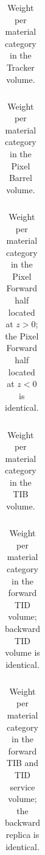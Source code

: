 \documentclass{cmspaper}
\begin{document}
\vskip 1cm


\begin{table}[h]
\begin{center}
\begin{tabular}{clrrrrrr}

\end{tabular}
\caption{Weight per material category in the Tracker volume.}
\end{center}
\end{table}

\begin{table}[h]
\begin{center}
\begin{tabular}{clrrrrrr}

\end{tabular}
\caption{Weight per material category in the Pixel Barrel volume.}
\end{center}
\end{table}

\begin{table}[h]
\begin{center}
\begin{tabular}{clrrrrrr}

\end{tabular}
\caption{Weight per material category in the Pixel Forward half located at $z>0$; the Pixel Forward half located at $z<0$ is identical.}
\end{center}
\end{table}

\begin{table}[h]
\begin{center}
\begin{tabular}{clrrrrrr}

\end{tabular}
\caption{Weight per material category in the TIB volume.}
\end{center}
\end{table}

\begin{table}[h]
\begin{center}
\begin{tabular}{clrrrrrr}

\end{tabular}
\caption{Weight per material category in the forward TID volume; backward TID volume is identical.}
\end{center}
\end{table}

\begin{table}[h]
\begin{center}
\begin{tabular}{clrrrrrr}

\end{tabular}
\caption{Weight per material category in the forward TIB and TID service volume; the backward replica is identical.}
\end{center}
\end{table}
\end{document}
